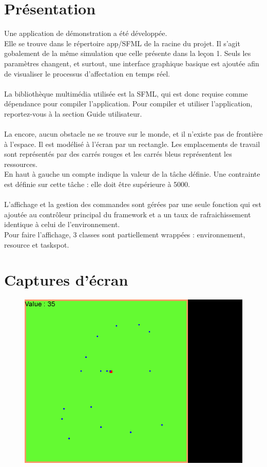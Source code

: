 \section{Présentation}
Une application de démonstration a été développée.\\
Elle se trouve dans le répertoire app/SFML de la racine du projet. Il s'agit gobalement de la même simulation que celle présente dans la leçon 1. Seuls les paramètres changent, et surtout, une interface graphique basique est ajoutée afin de visualiser le processus d'affectation en temps réel.\\\\

La bibliothèque multimédia utilisée est la SFML, qui est donc requise comme dépendance pour compiler l'application. Pour compiler et utiliser l'application, reportez-vous à la section Guide utilisateur.\\\\

La encore, aucun obstacle ne se trouve sur le monde, et il n'existe pas de frontière à l'espace. Il est modélisé à l'écran par un rectangle. Les emplacements de travail sont représentés par des carrés rouges et les carrés bleus représentent les ressources.\\
En haut à gauche un compte indique la valeur de la tâche définie. Une contrainte est définie sur cette tâche : elle doit être supérieure à 5000.\\\\

L'affichage et la gestion des commandes sont gérées par une seule fonction qui est ajoutée au contrôleur principal du framework et a un taux de rafraichissement identique à celui de l'environnement.\\
Pour faire l'affichage, 3 classes sont partiellement wrappées : environnement, resource et taskspot.

\section{Captures d'écran}

\begin{figure}[!h]\centering
    \includegraphics[scale=0.5]{screens/1.png}
\end{figure}


